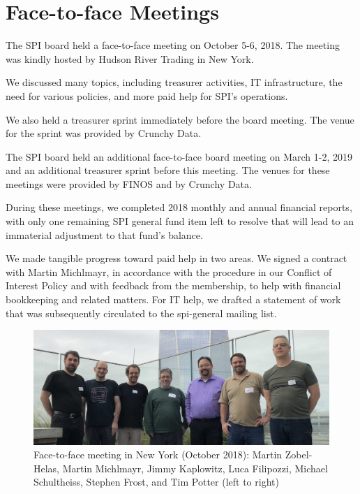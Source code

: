 \documentclass[a4paper]{report}
\begin{document}
\section{Face-to-face Meetings}

The SPI board held a face-to-face meeting on October 5-6, 2018.
The meeting was kindly hosted by Hudson River Trading in New York.

We discussed many topics, including treasurer activities, IT
infrastructure, the need for various policies, and more paid help for
SPI's operations.

We also held a treasurer sprint immediately before the board meeting.
The venue for the sprint was provided by Crunchy Data.

The SPI board held an additional face-to-face board meeting on March 1-2, 2019
and an additional treasurer sprint before this meeting. The venues for these
meetings were provided by FINOS and by Crunchy Data.

During these meetings, we completed 2018 monthly and annual financial reports,
with only one remaining SPI general fund item left to resolve that will lead to
an immaterial adjustment to that fund's balance.

We made tangible progress toward paid help in two areas. We signed a contract
with Martin Michlmayr, in accordance with the procedure in our Conflict of
Interest Policy and with feedback from the membership, to help with financial
bookkeeping and related matters. For IT help, we drafted a statement of work
that was subsequently circulated to the spi-general mailing list.

\begin{figure}[h]
\centering

\includegraphics[scale=0.14]{images/2018-october-f2f}

\caption{Face-to-face meeting in New York (October 2018): Martin
Zobel-Helas, Martin Michlmayr, Jimmy Kaplowitz, Luca Filipozzi, Michael
Schultheiss, Stephen Frost, and Tim Potter (left to right)}

\end{figure}
\end{document}
